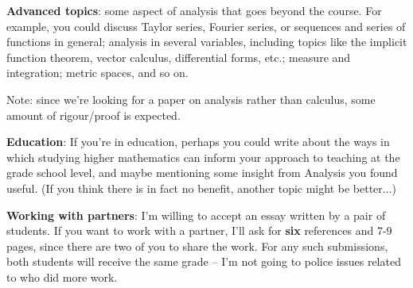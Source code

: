 \documentclass[letterpaper,12pt]{amsart}
\begin{document}
{\bf Advanced topics}: some aspect of analysis that goes beyond the course. For example, you could discuss Taylor series, Fourier series, or sequences and series of functions in general; analysis in several variables, including topics like the implicit function theorem, vector calculus, differential forms, etc.; measure and integration; metric spaces, and so on. 

Note: since we're looking for a paper on analysis rather than calculus, some amount of rigour/proof is expected.

{\bf Education}: If you're in education, perhaps you could write about the ways in which studying higher mathematics can inform your approach to teaching at the grade school level, and maybe mentioning some insight from Analysis you found useful. (If you think there is in fact no benefit, another topic might be better...)

{\bf Working with partners}: I'm willing to accept an essay written by a pair of students. If you want to work with a partner, I'll ask for {\bf six} references and 7-9 pages, since there are two of you to share the work. For any such submissions, both students will receive the same grade -- I'm not going to police issues related to who did more work.

 
\end{document}
